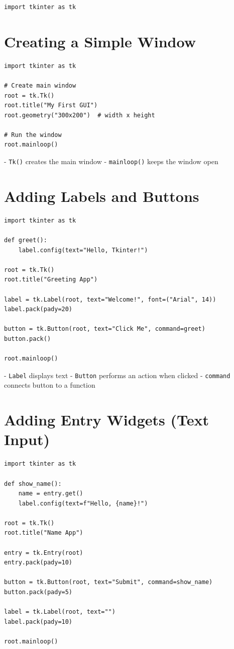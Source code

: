 \begin{verbatim}
import tkinter as tk
\end{verbatim}

\section{Creating a Simple Window}

\begin{verbatim}
import tkinter as tk

# Create main window
root = tk.Tk()
root.title("My First GUI")
root.geometry("300x200")  # width x height

# Run the window
root.mainloop()
\end{verbatim}

- \texttt{Tk()} creates the main window  
- \texttt{mainloop()} keeps the window open  

\section{Adding Labels and Buttons}

\begin{verbatim}
import tkinter as tk

def greet():
    label.config(text="Hello, Tkinter!")

root = tk.Tk()
root.title("Greeting App")

label = tk.Label(root, text="Welcome!", font=("Arial", 14))
label.pack(pady=20)

button = tk.Button(root, text="Click Me", command=greet)
button.pack()

root.mainloop()
\end{verbatim}

- \texttt{Label} displays text  
- \texttt{Button} performs an action when clicked  
- \texttt{command} connects button to a function  

\section{Adding Entry Widgets (Text Input)}

\begin{verbatim}
import tkinter as tk

def show_name():
    name = entry.get()
    label.config(text=f"Hello, {name}!")

root = tk.Tk()
root.title("Name App")

entry = tk.Entry(root)
entry.pack(pady=10)

button = tk.Button(root, text="Submit", command=show_name)
button.pack(pady=5)

label = tk.Label(root, text="")
label.pack(pady=10)

root.mainloop()
\end{verbatim}

